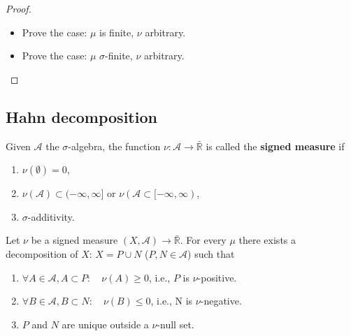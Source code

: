 \begin{proof}
\begin{itemize}
		We define $\tau = \mu + \nu$, sine now $mu \leq \tau$ and $\nu \leq \tau$, we can apply the lemma above, and get $\tau = g \circ \mu$ and $\tau = h \circ \nu$. Now define $N:= \{M \subset X | \mu(M) = 0\}$ and $f$:
		\begin{equation*}
			f(x) = \left\{ \begin{aligned}
				\frac{h(x)}{g(x)} \quad & x \in N^c\\
				0 \quad & x \in N
			\end{aligned}\right.
		\end{equation*}
		then $\forall A \in \mathcal{A}$( $N$ excluded):
		\begin{equation*}
			\nu(A) = \int_A h d \tau = \int_A f \circ g d\tau = \int_A f d \mu
		\end{equation*}
		\item Prove the case: $\mu$ is finite, $\nu$ arbitrary. 
		\item Prove the case: $\mu$ $\sigma$-finite, $\nu$ arbitrary. 
	\end{itemize}
\end{proof}


\subsection{Hahn decomposition}
\begin{definition}
	Given $\mathcal{A}$ the $\sigma$-algebra, the function $\nu: \mathcal{A} \rightarrow \bar{\mathbb{R}}$ is called the \textbf{signed measure} if 
	\begin{enumerate}
		\item $\nu(\emptyset) = 0$,
		\item $\nu(\mathcal{A}) \subset (-\infty, \infty]$ or $\nu(\mathcal{A} \subset [-\infty, \infty)$,
		\item $\sigma$-additivity. 
	\end{enumerate}
\end{definition}


\begin{theorem}
Let $\nu$ be a signed measure $(X, \mathcal{A}) \rightarrow \bar{\mathbb{R}}$. For every $\mu$ there exists a decomposition of $X$: $X = P \cup N$ ($P, N \in \mathcal{A}$) such that 
\begin{enumerate}
	\item $\forall A \in \mathcal{A}, A \subset P:\quad \nu(A) \ge 0$, i.e., $P$ is $\nu$-positive. 
	\item $\forall B \in \mathcal{A}, B \subset N: \quad \nu(B) \le 0$, i.e., N is $\nu$-negative. 
	\item $P$ and $N$ are unique outside a $\nu$-null set. 
\end{enumerate}
\end{theorem}




